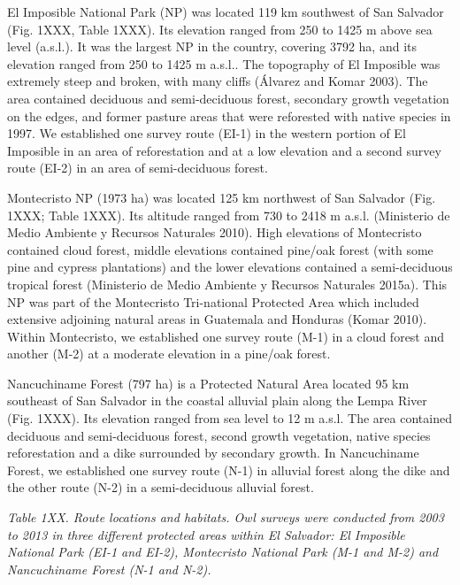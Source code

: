 \documentclass[
]{article}
\begin{document}
El Imposible National Park (NP) was located 119 km southwest of San
Salvador (Fig. 1XXX, Table 1XXX). Its elevation ranged from 250 to 1425
m above sea level (a.s.l.). It was the largest NP in the country,
covering 3792 ha, and its elevation ranged from 250 to 1425 m a.s.l..
The topography of El Imposible was extremely steep and broken, with many
cliffs (Álvarez and Komar 2003). The area contained deciduous and
semi-deciduous forest, secondary growth vegetation on the edges, and
former pasture areas that were reforested with native species in 1997.
We established one survey route (EI-1) in the western portion of El
Imposible in an area of reforestation and at a low elevation and a
second survey route (EI-2) in an area of semi-deciduous forest.

Montecristo NP (1973 ha) was located 125 km northwest of San Salvador
(Fig. 1XXX; Table 1XXX). Its altitude ranged from 730 to 2418 m a.s.l.
(Ministerio de Medio Ambiente y Recursos Naturales 2010). High
elevations of Montecristo contained cloud forest, middle elevations
contained pine/oak forest (with some pine and cypress plantations) and
the lower elevations contained a semi-deciduous tropical forest
(Ministerio de Medio Ambiente y Recursos Naturales 2015a). This NP was
part of the Montecristo Tri-national Protected Area which included
extensive adjoining natural areas in Guatemala and Honduras (Komar
2010). Within Montecristo, we established one survey route (M-1) in a
cloud forest and another (M-2) at a moderate elevation in a pine/oak
forest.

Nancuchiname Forest (797 ha) is a Protected Natural Area located 95 km
southeast of San Salvador in the coastal alluvial plain along the Lempa
River (Fig. 1XXX). Its elevation ranged from sea level to 12 m a.s.l.
The area contained deciduous and semi-deciduous forest, second growth
vegetation, native species reforestation and a dike surrounded by
secondary growth. In Nancuchiname Forest, we established one survey
route (N-1) in alluvial forest along the dike and the other route (N-2)
in a semi-deciduous alluvial forest.

\emph{Table 1XX. Route locations and habitats. Owl surveys were
conducted from 2003 to 2013 in three different protected areas within El
Salvador: El Imposible National Park (EI-1 and EI-2), Montecristo
National Park (M-1 and M-2) and Nancuchiname Forest (N-1 and N-2). }
\end{document}
